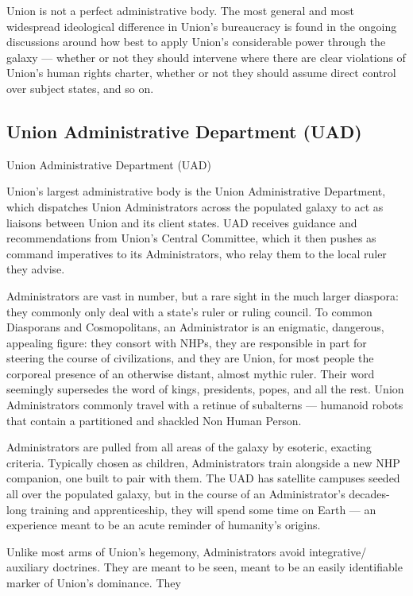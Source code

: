 Union is not a perfect administrative body. The most general and most widespread ideological
difference in Union’s bureaucracy is found in the ongoing discussions around how best to apply
Union’s considerable power through the galaxy — whether or not they should intervene where
there are clear violations of Union’s human rights charter, whether or not they should assume
direct control over subject states, and so on.


\subsection{Union Administrative Department (UAD)}

Union Administrative Department (UAD)

Union’s largest administrative body is the Union Administrative Department, which dispatches
Union Administrators across the populated galaxy to act as liaisons between Union and its client
states. UAD receives guidance and recommendations from Union’s Central Committee, which it
then pushes as command imperatives to its Administrators, who relay them to the local ruler they
advise.


Administrators are vast in number, but a rare sight in the much larger diaspora: they commonly
only deal with a state’s ruler or ruling council. To common Diasporans and Cosmopolitans, an
Administrator is an enigmatic, dangerous, appealing figure: they consort with NHPs, they are
responsible in part for steering the course of civilizations, and they are Union, for most people
the corporeal presence of an otherwise distant, almost mythic ruler. Their word seemingly
supersedes the word of kings, presidents, popes, and all the rest. Union Administrators
commonly travel with a retinue of subalterns — humanoid robots that contain a partitioned and
shackled Non Human Person.


Administrators are pulled from all areas of the galaxy by esoteric, exacting criteria. Typically
chosen as children, Administrators train alongside a new NHP companion, one built to pair with
them. The UAD has satellite campuses seeded all over the populated galaxy, but in the course of
an Administrator’s decades-long training and apprenticeship, they will spend some time on Earth
— an experience meant to be an acute reminder of humanity’s origins.


Unlike most arms of Union’s hegemony, Administrators avoid integrative/ auxiliary doctrines.
They are meant to be seen, meant to be an easily identifiable marker of Union’s dominance. They




